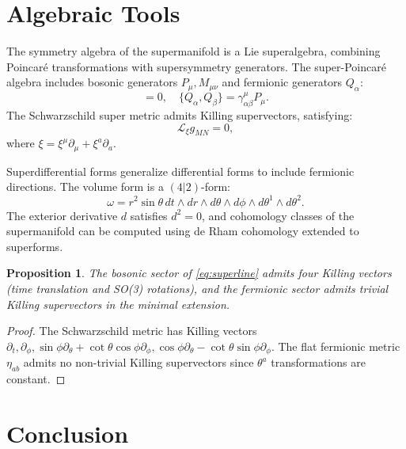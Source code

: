 \documentclass[12pt]{article}
\theoremstyle{plain}
\newtheorem{proposition}{Proposition}
\newcommand{\lie}[1]{\mathcal{L}_{#1}}
\begin{document}
\section{Algebraic Tools}

The symmetry algebra of the supermanifold is a Lie superalgebra, combining Poincaré transformations with supersymmetry generators. The super-Poincaré algebra includes bosonic generators $P_{\mu}, M_{\mu\nu}$ and fermionic generators $Q_{\alpha}$:
\begin{equation}
[P_{\mu}, Q_{\alpha}] = 0, \quad \{ Q_{\alpha}, Q_{\beta} \} = \gamma^{\mu}_{\alpha\beta} P_{\mu}.
\end{equation}
The Schwarzschild super metric admits Killing supervectors, satisfying:
\begin{equation}
\lie{\xi} g_{MN} = 0,
\end{equation}
where $\xi = \xi^{\mu} \partial_{\mu} + \xi^{a} \partial_{a}$.

Superdifferential forms generalize differential forms to include fermionic directions. The volume form is a $(4|2)$-form:
\begin{equation}
\omega = r^{2} \sin\theta \, dt \wedge dr \wedge d\theta \wedge d\phi \wedge d\theta^{1} \wedge d\theta^{2}.
\end{equation}
The exterior derivative $d$ satisfies $d^{2} = 0$, and cohomology classes of the supermanifold can be computed using de Rham cohomology extended to superforms.

\begin{proposition}
The bosonic sector of \eqref{eq:superline} admits four Killing vectors (time translation and SO(3) rotations), and the fermionic sector admits trivial Killing supervectors in the minimal extension.
\end{proposition}

\begin{proof}
The Schwarzschild metric has Killing vectors $\partial_{t}, \partial_{\phi}, \sin\phi \partial_{\theta} + \cot\theta \cos\phi \partial_{\phi}, \cos\phi \partial_{\theta} - \cot\theta \sin\phi \partial_{\phi}$. The flat fermionic metric $\eta_{ab}$ admits no non-trivial Killing supervectors since $\theta^{a}$ transformations are constant.
\end{proof}

\section{Conclusion}
\end{document}
